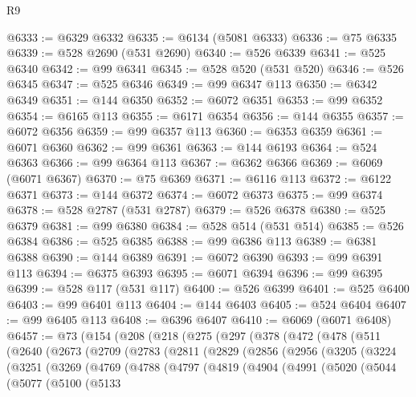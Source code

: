 \begin{lexlean}{R9}
\begin{coremodule}
{{{{{{{{{{{{{{{{{{{{{{{{{{{{{{{{{{{{{{{{{{{{{{{{{{{{{{{{{{{{{{{{{{{{{{{{{{{{{{{{{{{{@6333 := @6329 @6332
@6335 := @6134 (@5081 @6333)
@6336 := @75 @6335
@6339 := @528 @2690 (@531 @2690)
@6340 := @526 @6339
@6341 := @525 @6340
@6342 := @99 @6341
@6345 := @528 @520 (@531 @520)
@6346 := @526 @6345
@6347 := @525 @6346
@6349 := @99 @6347 @113
@6350 := @6342 @6349
@6351 := @144 @6350
@6352 := @6072 @6351
@6353 := @99 @6352
@6354 := @6165 @113
@6355 := @6171 @6354
@6356 := @144 @6355
@6357 := @6072 @6356
@6359 := @99 @6357 @113
@6360 := @6353 @6359
@6361 := @6071 @6360
@6362 := @99 @6361
@6363 := @144 @6193
@6364 := @524 @6363
@6366 := @99 @6364 @113
@6367 := @6362 @6366
@6369 := @6069 (@6071 @6367)
@6370 := @75 @6369
@6371 := @6116 @113
@6372 := @6122 @6371
@6373 := @144 @6372
@6374 := @6072 @6373
@6375 := @99 @6374
@6378 := @528 @2787 (@531 @2787)
@6379 := @526 @6378
@6380 := @525 @6379
@6381 := @99 @6380
@6384 := @528 @514 (@531 @514)
@6385 := @526 @6384
@6386 := @525 @6385
@6388 := @99 @6386 @113
@6389 := @6381 @6388
@6390 := @144 @6389
@6391 := @6072 @6390
@6393 := @99 @6391 @113
@6394 := @6375 @6393
@6395 := @6071 @6394
@6396 := @99 @6395
@6399 := @528 @117 (@531 @117)
@6400 := @526 @6399
@6401 := @525 @6400
@6403 := @99 @6401 @113
@6404 := @144 @6403
@6405 := @524 @6404
@6407 := @99 @6405 @113
@6408 := @6396 @6407
@6410 := @6069 (@6071 @6408)
@6457 := @73
    (@154
      (@208
        (@218
          (@275
            (@297
              (@378
                (@472
                  (@478
                    (@511
                      (@2640
                        (@2673
                          (@2709
                            (@2783
                              (@2811
                                (@2829
                                  (@2856
                                    (@2956
                                      (@3205
                                        (@3224
                                          (@3251
                                            (@3269
                                              (@4769
                                                (@4788
                                                  (@4797
                                                    (@4819
                                                      (@4904
                                                        (@4991
                                                          (@5020
                                                            (@5044
                                                              (@5077
                                                                (@5100
                                                                  (@5133
}}}}}}}}}}}}}}}}}}}}}}}}}}}}}}}}}}}}}}}}}}}}}}}}}}}}}}}}}}}}}}}}}}}}}}}}}}}}}}}}}}}}
\end{coremodule}
\end{lexlean}
